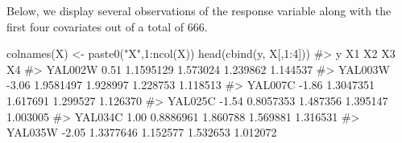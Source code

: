 Below, we display several observations of the response variable along with the first four covariates out of a total of 666.
\begin{example}
    colnames(X) <- paste0("X",1:ncol(X))
    head(cbind(y, X[,1:4]))
    #>               y        X1       X2       X3       X4
    #>   YAL002W  0.51 1.1595129 1.573024 1.239862 1.144537
    #>   YAL003W -3.06 1.9581497 1.928997 1.228753 1.118513
    #>   YAL007C -1.86 1.3047351 1.617691 1.299527 1.126370
    #>   YAL025C -1.54 0.8057353 1.487356 1.395147 1.003005
    #>   YAL034C  1.00 0.8886961 1.860788 1.569881 1.316531
    #>   YAL035W -2.05 1.3377646 1.152577 1.532653 1.012072
\end{example}


